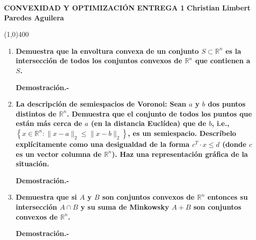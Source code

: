 \center \textbf{CONVEXIDAD Y OPTIMIZACIÓN}
\center \textbf{\Large ENTREGA 1}
\center \textbf{ \textbf{Christian Limbert Paredes Aguilera}}

\line(1,0){400}


\begin{enumerate}

    \item \textbf{\boldmath Demuestra que la envoltura convexa de un conjunto $S\subset \mathbb{R}^n$ es la intersección de todos los conjuntos convexos de $\mathbb{R}^n$ que contienen a $S$.}

	\textbf{Demostración.-}\;

    \item \textbf{\boldmath La descripción de semiespacios de Voronoi: Sean $a$ y $b$ dos puntos distintos de $\mathbb{R}^n$. Demuestra que el conjunto de todos los puntos que están más cerca de $a$ (en la distancia Euclídea) que de $b$, i.e., $\left\{x\in \mathbb{R}^n : \|x-a\|_2 \leq \|x-b\|_2\right\}$, es un semiespacio. Descríbelo explícitamente como una desigualdad de la forma $c^T\cdot x \leq d$ (donde $c$ es un vector columna de $\mathbb{R}^n$). Haz una representación gráfica de la situación.}

	\textbf{Demostración.-}\;

    \item \textbf{\boldmath Demuestra que si $A$ y $B$ son conjuntos convexos de $\mathbb{R}^n$ entonces su intersección $A\cap B$ y su suma de Minkowsky $A+B$ son conjuntos convexos de $\mathbb{R}^n$.}

	\textbf{Demostración.-}\;
	
\end{enumerate}
